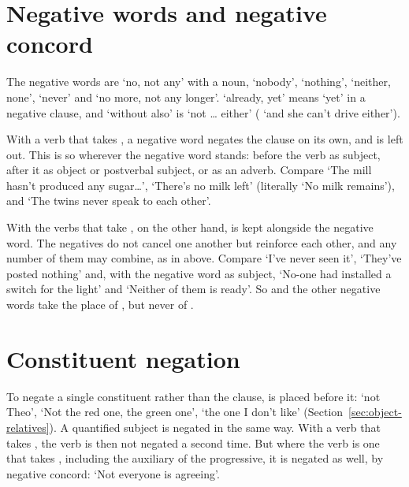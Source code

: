 \section{Negative words and negative concord}\label{sec:neg-words}
The negative words are  `no, not any' with a noun,  `nobody',  `nothing',  `neither, none',  `never' and  `no more, not any longer'.  `already, yet' means `yet' in a negative clause, and  `without also' is `not \ldots{} either' ( `and she can't drive either').

With a verb that takes , a negative word negates the clause on its own, and  is left out. This is so wherever the negative word stands: before the verb as subject, after it as object or postverbal subject, or as an adverb.
Compare  `The mill hasn't produced any sugar\ldots',  `There's no milk left' (literally `No milk remains'), and  `The twins never speak to each other'.

With the verbs that take , on the other hand,  is kept alongside the negative word. The negatives do not cancel one another but reinforce each other, and any number of them may combine, as in  above.
Compare  `I've never seen it',  `They've posted nothing' and, with the negative word as subject,  `No-one had installed a switch for the light' and  `Neither of them is ready'. So  and the other negative words take the place of , but never of .

\section{Constituent negation}\label{sec:constituent-negation}
To negate a single constituent rather than the clause,  is placed before it:  `not Theo',  `Not the red one, the green one',  `the one I don't like' (Section~\ref{sec:object-relatives}). A quantified subject is negated in the same way. With a verb that takes , the verb is then not negated a second time.
But where the verb is one that takes , including the auxiliary of the progressive, it is negated as well, by negative concord:  `Not everyone is agreeing'.


